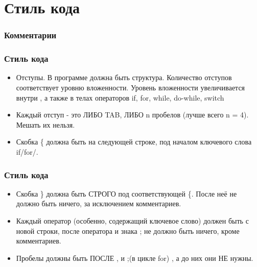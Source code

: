 \documentclass[12pt,pdf,hyperref={unicode}]{beamer}
\begin{document}
\section{Стиль кода}


\begin{frame}
\frametitle{Комментарии}


\end{frame}

\begin{frame}
\frametitle{Стиль кода} 

\begin{itemize}
\item Отступы. В программе должна быть структура.
Количество отступов соответствует уровню вложенности. Уровень вложенности увеличивается внутри { }, а также в телах операторов if, for, while, do-while, switch
\item Каждый отступ - это ЛИБО TAB, ЛИБО n пробелов (лучше всего n = 4). Мешать их нельзя.
\item Скобка \{ должна быть на следующей строке, под началом ключевого слова if/for/.
\end{itemize}


\end{frame}


\begin{frame}
\frametitle{Стиль кода} 

\begin{itemize}
\item Скобка \} должна быть СТРОГО под соответствующей \{. После неё не должно быть ничего, за исключением комментариев.
\item Каждый оператор (особенно, содержащий ключевое слово) должен быть с новой строки, после оператора и знака ; не должно быть ничего, кроме комментариев.
\item Пробелы должны быть ПОСЛЕ , и ;(в цикле for) , а до них они НЕ нужны.
\end{itemize}
\end{frame}
\end{document}
